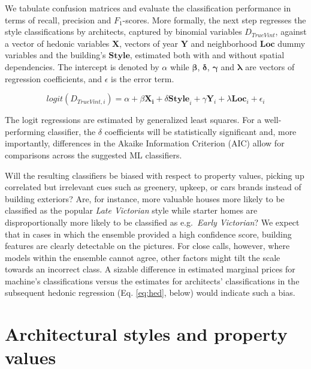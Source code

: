 \documentclass[]{article}
\begin{document}
We tabulate confusion matrices and evaluate the classification
performance in terms of recall, precision and \(F_1\)-scores. More
formally, the next step regresses the style classifications by
architects, captured by binomial variables \(D_{TrueVint}\), against a
vector of hedonic variables \(\mathbf{X}\), vectors of year
\(\mathbf{Y}\) and neighborhood \(\bm{Loc}\) dummy variables and the
building's \(\mathbf{Style}\), estimated both with and without spatial
dependencies. The intercept is denoted by \(\alpha\) while
\(\bm{\beta}\), \(\bm{\delta}\), \(\bm{\gamma}\) and \(\bm{\lambda}\)
are vectors of regression coefficients, and \(\epsilon\) is the error
term.

\begin{equation} \label{eq:rev}
  logit( D_{TrueVint,i} ) = \alpha + \beta\mathbf{X_i} + \delta\mathbf{Style}_i +  \gamma\mathbf{Y}_i + \lambda\mathbf{Loc}_i +  \epsilon_i
\end{equation}

The logit regressions are estimated by generalized least squares. For a
well-performing classifier, the \(\delta\) coefficients will be
statistically significant and, more importantly, differences in the
Akaike Information Criterion (AIC) allow for comparisons across the
suggested ML classifiers.

Will the resulting classifiers be biased with respect to property
values, picking up correlated but irrelevant cues such as greenery,
upkeep, or cars brands instead of building exteriors? Are, for instance,
more valuable houses more likely to be classified as the popular
\emph{Late Victorian} style while starter homes are disproportionally
more likely to be classified as e.g.~\emph{Early Victorian}? We expect
that in cases in which the ensemble provided a high confidence score,
building features are clearly detectable on the pictures. For close
calls, however, where models within the ensemble cannot agree, other
factors might tilt the scale towards an incorrect class. A sizable
difference in estimated marginal prices for machine's classifications
versus the estimates for architects' classifications in the subsequent
hedonic regression (Eq. \ref{eq:hed}, below) would indicate such a bias.

\hypertarget{architectural-styles-and-property-values}{%
\section{Architectural styles and property
values}\label{architectural-styles-and-property-values}}
\end{document}
